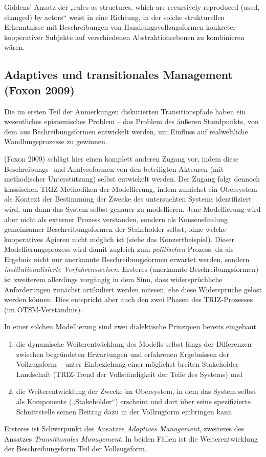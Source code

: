 \documentclass[11pt,a4paper]{article}
\begin{document}
Giddens' Ansatz der „rules as structures, which are recursively reproduced
(used, changed) by actors“ weist in eine Richtung, in der solche strukturellen
Erkenntnisse mit Beschreibungen von Handlungsvollzugsformen konkreter
kooperativer Subjekte auf verschiedenen Abstraktionsebenen zu kombinieren
wären.

\subsection{Adaptives und transitionales Management (Foxon 2009)}

Die im ersten Teil der Anmerkungen diskutierten Transitionspfade haben ein
wesentliches epistemisches Problem -- das Problem des äußeren Standpunkts, von
dem aus Bechreibungsformen entwickelt werden, um Einfluss auf realweltliche
Wandlungsprozesse zu gewinnen.

(Foxon 2009) schlägt hier einen komplett anderen Zugang vor, indem diese
Beschreibungs- und Analyseformen von den beteiligten Akteuren (mit
methodischer Unterstützung) selbst entwickelt werden. Der Zugang folgt dennoch
klassischen TRIZ-Methodiken der Modellierung, indem zunächst ein Obersystem
als Kontext der Bestimmung der Zwecke des untersuchten Systems identifiziert
wird, um dann das System selbst genauer zu modellieren. Jene Modellierung wird
aber nicht als externer Prozess verstanden, sondern als Konsensfindung
gemeinsamer Beschreibungsformen der Stakeholder selbst, ohne welche
kooperatives Agieren nicht möglich ist (siehe das Konzertbeispiel). Dieser
Modellierungsprozess wird damit zugleich zum \emph{politischen} Prozess, da
als Ergebnis nicht nur anerkannte Beschreibungsformen erwartet werden, sondern
\emph{institutionalisierte Verfahrensweisen}. Ersteres (anerkannte
Beschreibungsformen) ist zweiterem allerdings vorgängig in dem Sinn, dass
widersprüchliche Anforderungen zunächst artikuliert werden müssen, ehe diese
Widersprüche gelöst werden können. Dies entspricht aber auch den zwei Phasen
des TRIZ-Prozesses (im OTSM-Verständnis).

In einer solchen Modellierung sind zwei dialektische Prinzipien bereits
eingebaut
\begin{enumerate}
\item die dynamische Weiterentwicklung des Modells selbst längs der
  Differenzen zwischen begründeten Erwartungen und erfahrenen Ergebnissen der
  Vollzugsform -- unter Einbeziehung einer möglichst breiten
  Stakeholder-Landschaft (TRIZ-Trend der Vollständigkeit der Teile des
  Systems) und
\item die Weiterentwicklung der Zwecke im Obersystem, in dem das System selbst
  als Komponente („Stakeholder“) erscheint und dort über seine spezifizierte
  Schnittstelle seinen Beitrag dazu in der Vollzugform einbringen kann.
\end{enumerate}
Ersteres ist Schwerpunkt des Ansatzes \emph{Adaptives Management}, zweiteres
des Ansatzes \emph{Transitionales Management}. In beiden Fällen ist die
Weiterentwicklung der Beschreibungsform Teil der Vollzugsform.
\end{document}

